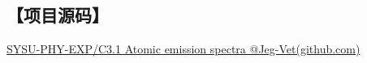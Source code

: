 \documentclass[12pt,a4paper,UTF8]{ctexart}
\begin{document}
\subsection*{【项目源码】}
\href{https://github.com/Jeg-Vet/SYSU-PHY-EXP/tree/main/C3.1-Atomic_emission_spectra}{SYSU-PHY-EXP/C3.1 Atomic emission spectra @Jeg-Vet(github.com)}
\end{document}
